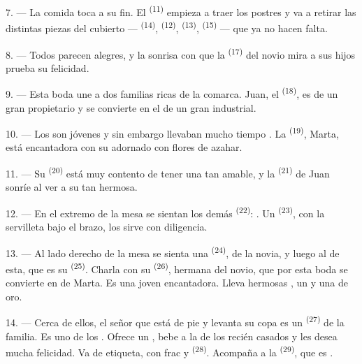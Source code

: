 7. --- La comida toca a su fin. El  \textsuperscript{(11)} empieza a
traer los postres y va a retirar las distintas piezas del cubierto ---
 \textsuperscript{(14)},  \textsuperscript{(12)},
 \textsuperscript{(13)},  \textsuperscript{(15)} --- que ya
no hacen falta.

\VUsaut{3.0mm}

8. --- Todos parecen alegres, y la sonrisa con que la 
\textsuperscript{(17)} del novio mira a sus hijos prueba su felicidad.

9. --- Esta boda une a dos familias ricas de la comarca. Juan, el
 \textsuperscript{(18)}, es  de un gran propietario y se
convierte en el  de un gran industrial.

10. --- Los  son jóvenes y sin embargo llevaban mucho tiempo
. La  \textsuperscript{(19)}, Marta, está
encantadora con su  adornado con flores de azahar.

11. --- Su  \textsuperscript{(20)} está muy contento de tener una
 tan amable, y la  \textsuperscript{(21)} de Juan sonríe
al ver a su  tan hermosa.

12. --- En el extremo de la mesa se sientan los demás 
\textsuperscript{(22)}: . Un
 \textsuperscript{(23)}, con la servilleta bajo el brazo, los sirve
con diligencia.

\VUsaut{3.0mm}

13. --- Al lado derecho de la mesa se sienta una 
\textsuperscript{(24)},  de la novia, y luego al  de
esta, que es su  \textsuperscript{(25)}. Charla con su
 \textsuperscript{(26)}, hermana del novio, que por esta boda
se convierte en  de Marta. Es una joven encantadora. Lleva
hermosas , un  y una  de
oro.

14. --- Cerca de ellos, el señor que está de pie y levanta su copa es un
 \textsuperscript{(27)} de la familia. Es uno de los
. Ofrece un , bebe a la
 de los recién casados y les desea mucha felicidad. Va de
etiqueta, con frac y  \textsuperscript{(28)}. Acompaña a
la  \textsuperscript{(29)}, que es .

